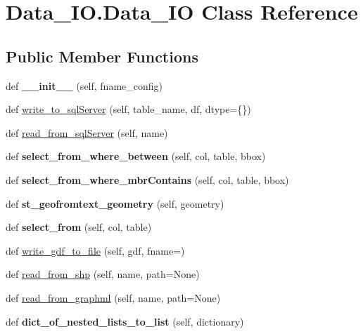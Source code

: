 \hypertarget{class_data___i_o_1_1_data___i_o}{}\section{Data\+\_\+\+I\+O.\+Data\+\_\+\+IO Class Reference}
\label{class_data___i_o_1_1_data___i_o}
\subsection*{Public Member Functions}
\begin{DoxyCompactItemize}
\item 
\mbox{\label{class_data___i_o_1_1_data___i_o_af8a115e2c7c31189d024320277edba70}} 
def {\bfseries \+\_\+\+\_\+init\+\_\+\+\_\+} (self, fname\+\_\+config)
\item 
def \hyperlink{class_data___i_o_1_1_data___i_o_a8e77138adf73f6baac7e31f3c2047962}{write\+\_\+to\+\_\+sql\+Server} (self, table\+\_\+name, df, dtype=\{\})
\item 
def \hyperlink{class_data___i_o_1_1_data___i_o_ade762847985a15a6dbd01c444be1742e}{read\+\_\+from\+\_\+sql\+Server} (self, name)
\item 
\mbox{\label{class_data___i_o_1_1_data___i_o_aeed90e6ae61f6ec8c5eee52edb6f6c80}} 
def {\bfseries select\+\_\+from\+\_\+where\+\_\+between} (self, col, table, bbox)
\item 
\mbox{\label{class_data___i_o_1_1_data___i_o_a1dcb3aeac7eacc2d9a138c6a9b682dbe}} 
def {\bfseries select\+\_\+from\+\_\+where\+\_\+mbr\+Contains} (self, col, table, bbox)
\item 
\mbox{\label{class_data___i_o_1_1_data___i_o_acf5dbea2c10614de7bb8f3662ee207b4}} 
def {\bfseries st\+\_\+geofromtext\+\_\+geometry} (self, geometry)
\item 
\mbox{\label{class_data___i_o_1_1_data___i_o_a810c525eedc66b1994d3d0ec54d42570}} 
def {\bfseries select\+\_\+from} (self, col, table)
\item 
def \hyperlink{class_data___i_o_1_1_data___i_o_ab2e95c0af4a65cfabe861ecf4a41b76e}{write\+\_\+gdf\+\_\+to\+\_\+file} (self, gdf, fname=\textquotesingle{}\textquotesingle{})
\item 
def \hyperlink{class_data___i_o_1_1_data___i_o_a14727729f303e0164a384debe39c3fea}{read\+\_\+from\+\_\+shp} (self, name, path=None)
\item 
def \hyperlink{class_data___i_o_1_1_data___i_o_aacbcba44953eedd8f504a6e6dff96f40}{read\+\_\+from\+\_\+graphml} (self, name, path=None)
\item 
\mbox{\label{class_data___i_o_1_1_data___i_o_aeac11ae1aa7056750a95292d34f7e08c}} 
def {\bfseries dict\+\_\+of\+\_\+nested\+\_\+lists\+\_\+to\+\_\+list} (self, dictionary)
\end{DoxyCompactItemize}
